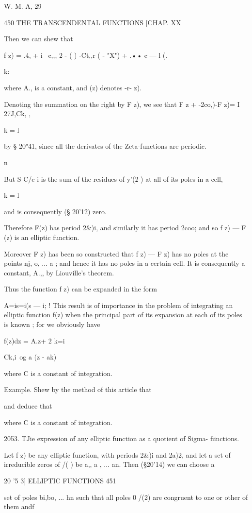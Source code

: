 {W. M. A, 29

450 THE TRANSCENDENTAL FUNCTIONS [CHAP. XX

Then we can shew that

f z) = .4, + i \ c,,, 2 - ( ) -Ct,,r ( - "X") + .•• c — l (.

k:

where A., is a constant, and (z) denotes -r- z).

Denoting the summation on the right by F z), we see that F z +
-2co,)-F z)= I 27J,Ck, ,

k = l

by § 20"41, since all the derivates of the Zeta-functions are
periodic.

n

But S C/c i is the sum of the residues of y'(2 ) at all of its poles
in a cell,

k = l

and is consequently (§ 20'12) zero.

Therefore F(z) has period 2\&)i, and similarly it has period 2coo; and
so f z) — F (z) is an elliptic function.

Moreover F z) has been so constructed that f z) — F z) has no poles at
the points nj, o, ... a ; and hence it has no poles in a certain cell.
It is consequently a constant, A.,, by Liouville's theorem.

Thus the function f z) can be expanded in the form

A=is=i(s — i; ! This result is of importance in the problem of
integrating an elliptic function f(z) when the principal part of its
expansion at each of its poles is known ; for we obviously have

f(z)dz = A.z+ 2 k=i

Ck,i\ og a (z - ak)

where C is a constant of integration.

Example. Shew by the method of this article that

and deduce that

where C is a constant of integration.

2053. TJie expression of any elliptic function as a quotient of Sigma-
fiinctions.

Let f z) be any elliptic function, with periods 2\&)i and 2a)2, and
let a set of irreducible zeros of /( ) be a,, a , ... an. Then
(§20'14) we can choose a

20 '5 3] ELLIPTIC FUNCTIONS 451

set of poles bi,bo, ... hn such that all poles 0 /(2) are congruent to
one or other of them andf

}
